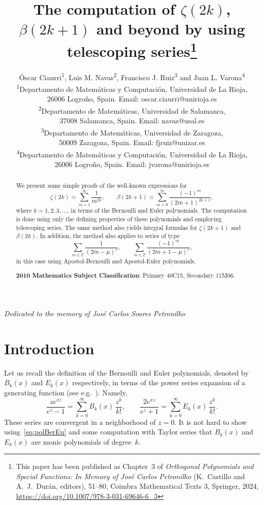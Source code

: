 \documentclass[11pt, oneside]{article}
\title{The computation of $\zeta(2k)$, $\beta(2k+1)$ and beyond by using telescoping series\thanks{This paper has been published as Chapter~3 of 
\textit{Orthogonal Polynomials and Special Functions: 
In Memory of Jos\'e Carlos Petronilho} 
(K.~Castillo and A.~J.~Dur\'an, editors), 51--80,
Coimbra Mathematical Texts 3, Springer, 2024,
\url{https://doi.org/10.1007/978-3-031-69646-6_3}}}
\author{\'Oscar Ciaurri\textsuperscript{1}, Luis M. Navas\textsuperscript{2},
Francisco J. Ruiz\textsuperscript{3} and Juan L. Varona\textsuperscript{4}\\[6pt]
\small\textsuperscript{1}Departamento de Matem\'aticas y Computaci\'on,
Universidad de La Rioja,\\[-2pt]
\small 26006 Logro\~no, Spain. Email: {oscar.ciaurri@unirioja.es}\\[6pt]
\small\textsuperscript{2}Departamento de Matem\'aticas,
Universidad de Salamanca,\\[-2pt]
\small 37008 Salamanca, Spain. Email: {navas@usal.es}\\[6pt]
\small\textsuperscript{3}Departamento de Matem\'aticas,
Universidad de Zaragoza,\\[-2pt]
\small 50009 Zaragoza, Spain. Email: {fjruiz@unizar.es}\\[6pt]
\small\textsuperscript{4}Departamento de Matem\'aticas y Computaci\'on, 
Universidad de La Rioja,\\[-2pt]
\small 26006 Logro\~no, Spain. Email: {jvarona@unirioja.es}}
\date{}
\newcommand{\Z}{\mathbb{Z}}
\theoremstyle{plain}
\theoremstyle{definition}
\begin{document}

\maketitle

\begin{center}\itshape
Dedicated to the memory of Jos\'e Carlos Soares Petronilho
\bigskip
\end{center}

\begin{abstract}
We present some simple proofs of the well-known expressions for
\[
  \zeta(2k) = \sum_{m=1}^\infty \frac{1}{m^{2k}},
  \qquad
  \beta(2k+1) = \sum_{m=0}^\infty \frac{(-1)^m}{(2m+1)^{2k+1}},
\]
where $k = 1,2,3,\dots$, in terms of the Bernoulli and Euler polynomials.
The computation is done using only the defining properties of these polynomials 
and employing telescoping series. The same method also yields integral formulas 
for $\zeta(2k+1)$ and $\beta(2k)$.
In addition, the method also applies to series of type
\[
  \sum_{m\in\Z} \frac{1}{(2m-\mu)^s},
  \qquad
  \sum_{m\in\Z} \frac{(-1)^m}{(2m+1-\mu)^s},
\]
in this case using Apostol-Bernoulli and Apostol-Euler polynomials.

\medskip

{\textbf{2010 Mathematics Subject Classification}: Primary 40C15, Secondary 11M06.}
\end{abstract}

\vfill

\section{Introduction}
\label{sec:intro}

Let us recall the definition of the Bernoulli and Euler polynomials, denoted by $B_{k}(x)$ and $E_{k}(x)$ respectively, in terms of the power series expansion of a generating function (see e.g.~\cite{Dil-NIST}). Namely,
\begin{equation}
\label{eq:polBerEu}
  \frac{ze^{xz}}{e^z-1} 
  = \sum_{k=0}^\infty B_k(x)\, \frac{z^k}{k!},
\qquad
  \frac{2 e^{xz}}{e^z+1}
  = \sum_{k=0}^\infty E_k(x)\, \frac{z^k}{k!}.
\end{equation}
These series are convergent in a neighborhood of $z = 0$.
It is not hard to show using~\eqref{eq:polBerEu} and some computation with Taylor series that $B_{k}(x)$ and $E_{k}(x)$ are monic polynomials of degree~$k$.
\end{document}
